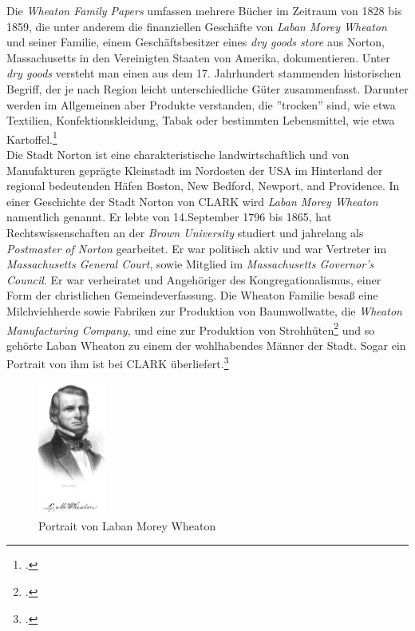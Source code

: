 \documentclass[12pt,a4paper]{article}
\begin{document}
Die \textit{Wheaton Family Papers} umfassen mehrere Bücher im Zeitraum von 1828 bis 1859, die unter anderem die finanziellen Geschäfte von \textit{Laban Morey Wheaton} und seiner Familie, einem Geschäftsbesitzer eines \textit{dry goods store} aus Norton, Massachusetts in den Vereinigten Staaten von Amerika, dokumentieren. Unter \textit{dry goods} versteht man einen aus dem 17. Jahrhundert stammenden historischen Begriff, der je nach Region leicht unterschiedliche Güter zusammenfasst. Darunter werden im Allgemeinen aber Produkte verstanden, die ''trocken'' sind, wie etwa Textilien, Konfektionskleidung, Tabak oder bestimmten Lebensmittel, wie etwa Kartoffel.\footcite[Definition von \textit{Dry Goods}, \protect\url{https://chestofbooks.com/reference/Dictionary-of-Dry-Goods/Dry-Goods.html}, 23.05.2019, Vgl.][]{cole2015complete}
\\
Die Stadt Norton ist eine charakteristische landwirtschaftlich und von Manufakturen geprägte Kleinstadt im Nordosten der USA im Hinterland der regional bedeutenden Häfen Boston, New Bedford, Newport, and Providence. In einer Geschichte der Stadt Norton von CLARK wird \textit{Laban Morey Wheaton} namentlich genannt. Er lebte von 14.September 1796 bis 1865, hat Rechtswissenschaften an der \textit{Brown University} studiert und jahrelang als \textit{Postmaster of Norton} gearbeitet. Er war politisch aktiv und war Vertreter im \textit{Massachusetts General Court}, sowie Mitglied im \textit{Massachusetts Governor's Council}. Er war verheiratet und Angehöriger des Kongregationalismus, einer Form der christlichen Gemeindeverfassung. Die Wheaton Familie besaß eine Milchviehherde sowie Fabriken zur Produktion von Baumwollwatte, die \textit{Wheaton Manufacturing Company,} und eine zur Produktion von Strohhüten\footcite[][S.6]{tomasek2013encoding} und so gehörte Laban Wheaton zu einem der wohlhabendes Männer der Stadt. Sogar ein Portrait von ihm ist bei CLARK überliefert.\footcite[][S.496]{clark1859history} 
\begin{figure}[H]
\centering
	\includegraphics[width=0.2\textwidth]{img/LMwheaton.jpg}  
    \caption[Portrait von Laban Morey Wheaton, Vgl. CLARK, George Faber: A History of the Town of Norton, Bristol County, Massachusetts, from 1669-1859.
Crosby, Nichols, and Company, and author at Norton, 1859, S.497.]{Portrait von Laban Morey Wheaton} \label{fig:LMwheaton}
\end{figure} 
\end{document}
